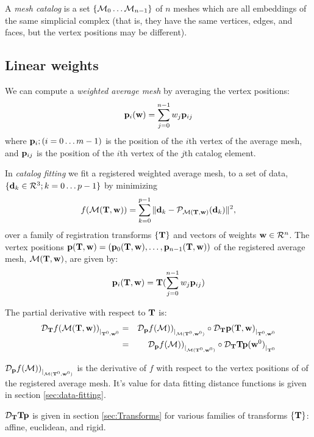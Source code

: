 \label{sec:Averaging}

A {\it mesh catalog} is a set $\{ {\mathcal M}_0 \ldots {\mathcal M}_{n-1} \}$
of $n$ meshes which are all embeddings
of the same simplicial complex
(that is, they have the same vertices, edges, and faces,
but the vertex positions may be different).

\subsection{Linear weights}
\label{sec:Linear-weights}

We can compute a {\it weighted average mesh} by averaging the vertex positions:
\begin{equation}
{\mathbf p}_i({\mathbf w}) = \sum_{j=0}^{n-1} w_j {\mathbf p}_{ij}
\end{equation}
where ${\mathbf p}_{i}; (i=0 \ldots m-1)$ is the position of the $i$th vertex of the average mesh,
and ${\mathbf p}_{ij}$ is the position of the $i$th vertex of the $j$th catalog element.

In {\it catalog fitting} we fit a registered weighted average mesh,
to a set of data, $\{ {\mathbf d}_k \in \mathcal{R}^3; k=0 \ldots p-1 \}$
by minimizing
\begin{equation}
f({\mathcal M}({\mathbf T},{\mathbf w})) = \sum_{k=0}^{p-1} \| {\mathbf d}_k - {\mathcal P}_{{\mathcal M}({\mathbf T},{\mathbf w})} ({\mathbf d}_k) \|^2 ,
\end{equation}
over a family of registration transforms $\{{\mathbf T}\}$
and vectors of weights ${\mathbf w} \in \mathcal{R}^n$.
The vertex positions ${\mathbf p}({\mathbf T},{\mathbf w}) = ({\mathbf p}_0({\mathbf T},{\mathbf w}), \ldots , {\mathbf p}_{n-1}({\mathbf T},{\mathbf w}))$
of the registered average mesh, ${\mathcal M}({\mathbf T},{\mathbf w})$, are given by:
\begin{equation}
{\mathbf p}_i({\mathbf T},{\mathbf w}) = {\mathbf T} ( \sum_{j=0}^{n-1} w_j {\mathbf p}_{ij} )
\end{equation}

The partial derivative with respect to ${\mathbf T}$
is:
\begin{eqnarray}
{\mathcal D}_{{\mathbf T}}{f({\mathcal M}({\mathbf T},{\mathbf w}))}_{\mid_{{\mathbf T}^0,{\mathbf w}^0}}
& = &
{\mathcal D}_{{\mathbf p}}{f({\mathcal M}))}_{\mid_{{\mathcal M}({\mathbf T}^0,{\mathbf w}^0)}}
\circ
{\mathcal D}_{{\mathbf T}}{{\mathbf p}({\mathbf T},{\mathbf w})}_{\mid_{{\mathbf T}^0,{\mathbf w}^0}}
\\
& = &
{\mathcal D}_{{\mathbf p}}{f({\mathcal M}))}_{\mid_{{\mathcal M}({\mathbf T}^0,{\mathbf w}^0)}}
\circ
{\mathcal D}_{{\mathbf T}}{{\mathbf T}{\mathbf p}({\mathbf w}^0)}_{\mid_{{\mathbf T}^0}}
\nonumber
\end{eqnarray}

${\mathcal D}_{{\mathbf p}}{f({\mathcal M}))}_{\mid_{{\mathcal M}({\mathbf T}^0,{\mathbf w}^0)}}$ is the derivative of $f$ with respect to
the vertex positions of of the registered average mesh.
It's value for data fitting distance functions
is given in section \ref{sec:data-fitting}.

${\mathcal D}_{{\mathbf T}}{{\mathbf T}{\mathbf p}}$ is given in section \ref{sec:Transforms}
for various families of transforms $\{{\mathbf T}\}$: affine, euclidean, and rigid.

